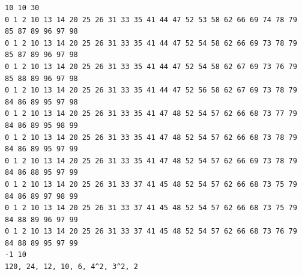 \begin{verbatim}
10 10 30
0 1 2 10 13 14 20 25 26 31 33 35 41 44 47 52 53 58 62 66 69 74 78 79 85 87 89 96 97 98 
0 1 2 10 13 14 20 25 26 31 33 35 41 44 47 52 54 58 62 66 69 73 78 79 85 87 89 96 97 98 
0 1 2 10 13 14 20 25 26 31 33 35 41 44 47 52 54 58 62 67 69 73 76 79 85 88 89 96 97 98 
0 1 2 10 13 14 20 25 26 31 33 35 41 44 47 52 56 58 62 67 69 73 78 79 84 86 89 95 97 98 
0 1 2 10 13 14 20 25 26 31 33 35 41 47 48 52 54 57 62 66 68 73 77 79 84 86 89 95 98 99 
0 1 2 10 13 14 20 25 26 31 33 35 41 47 48 52 54 57 62 66 68 73 78 79 84 86 89 95 97 99 
0 1 2 10 13 14 20 25 26 31 33 35 41 47 48 52 54 57 62 66 69 73 78 79 84 86 88 95 97 99 
0 1 2 10 13 14 20 25 26 31 33 37 41 45 48 52 54 57 62 66 68 73 75 79 84 86 89 97 98 99 
0 1 2 10 13 14 20 25 26 31 33 37 41 45 48 52 54 57 62 66 68 73 75 79 84 88 89 96 97 99 
0 1 2 10 13 14 20 25 26 31 33 37 41 45 48 52 54 57 62 66 68 73 76 79 84 88 89 95 97 99 
-1 10
120, 24, 12, 10, 6, 4^2, 3^2, 2
\end{verbatim}
